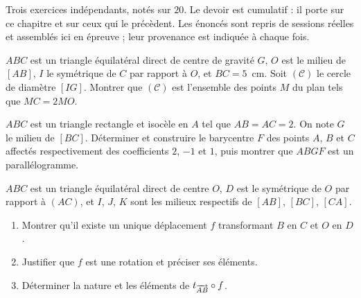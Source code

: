 \begin{devoir}[2 heures]
Trois exercices indépendants, notés sur $20$. Le devoir est cumulatif : il porte sur ce chapitre et sur ceux qui le précèdent. Les énoncés sont repris de sessions réelles et assemblés ici en épreuve ; leur provenance est indiquée à chaque fois.

$ABC$ est un triangle équilatéral direct de centre de gravité $G$, $O$ est le
milieu de $[AB]$, $I$ le symétrique de $C$ par rapport à $O$, et $BC = 5$~cm.
Soit $(\mathcal C)$ le cercle de diamètre $[IG]$. Montrer que
$(\mathcal C)$ est l'ensemble des points $M$ du plan tels que
$MC = 2MO$.

$ABC$ est un triangle rectangle et isocèle en $A$ tel que $AB = AC = 2$. On
note $G$ le milieu de $[BC]$. Déterminer et construire le barycentre $F$ des
points $A$, $B$ et $C$ affectés respectivement des coefficients $2$, $-1$ et
$1$, puis montrer que $ABGF$ est un parallélogramme.

$ABC$ est un triangle équilatéral direct de centre $O$, $D$ est le symétrique
de $O$ par rapport à $(AC)$, et $I$, $J$, $K$ sont les milieux respectifs de
$[AB]$, $[BC]$, $[CA]$.
\begin{enumerate}[label=\textbf{\alph*)}, leftmargin=*, itemsep=0.15em]
  \item Montrer qu'il existe un unique déplacement $f$ transformant $B$ en $C$
        et $O$ en $D$.
  \item Justifier que $f$ est une rotation et préciser ses éléments.
  \item Déterminer la nature et les éléments de
        $t_{\overrightarrow{AB}} \circ f$.
\end{enumerate}

\end{devoir}

